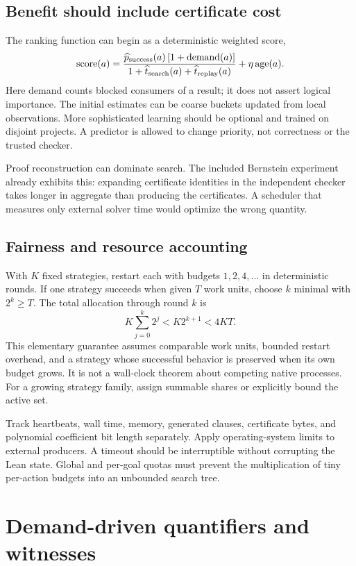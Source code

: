 \documentclass[11pt,a4paper]{article}
\begin{document}
\subsection{Benefit should include certificate cost}
The ranking function can begin as a deterministic weighted score,
\[
 \operatorname{score}(a)=
 \frac{\widehat{p}_{\rm success}(a)\,[1+\operatorname{demand}(a)]}
      {1+\widehat{t}_{\rm search}(a)+\widehat{t}_{\rm replay}(a)}
 +\eta\operatorname{age}(a).
\]
Here demand counts blocked consumers of a result; it does not assert logical importance. The initial estimates can be coarse buckets updated from local observations. More sophisticated learning should be optional and trained on disjoint projects. A predictor is allowed to change priority, not correctness or the trusted checker.

Proof reconstruction can dominate search. The included Bernstein experiment already exhibits this: expanding certificate identities in the independent checker takes longer in aggregate than producing the certificates. A scheduler that measures only external solver time would optimize the wrong quantity.

\subsection{Fairness and resource accounting}
With $K$ fixed strategies, restart each with budgets $1,2,4,\ldots$ in deterministic rounds. If one strategy succeeds when given $T$ work units, choose $k$ minimal with $2^k\ge T$. The total allocation through round $k$ is
\[
 K\sum_{j=0}^k2^j < K2^{k+1}<4KT.
\]
This elementary guarantee assumes comparable work units, bounded restart overhead, and a strategy whose successful behavior is preserved when its own budget grows. It is not a wall-clock theorem about competing native processes. For a growing strategy family, assign summable shares or explicitly bound the active set.

Track heartbeats, wall time, memory, generated clauses, certificate bytes, and polynomial coefficient bit length separately. Apply operating-system limits to external producers. A timeout should be interruptible without corrupting the Lean state. Global and per-goal quotas must prevent the multiplication of tiny per-action budgets into an unbounded search tree.

\section{Demand-driven quantifiers and witnesses}
\end{document}
